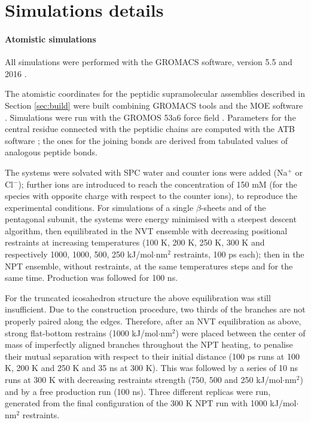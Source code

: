 \section{Simulations details} \label{sec:details}

\paragraph{Atomistic simulations}
All simulations were performed with the GROMACS software, version 5.5 and 2016 \cite{Berendsen1995,Abraham2015,gromacs_man}. 

The atomistic coordinates for the peptidic supramolecular assemblies described in Section \ref{sec:build} were built combining GROMACS tools and the MOE software \cite{moe}.
%
Simulations were run with the GROMOS 53a6 force field \cite{Oostenbrink2004}. Parameters for the central residue connected with the peptidic chains are computed with the ATB software \cite{Malde2011, Koziara2014}; the ones for the joining bonds are derived from tabulated values of analogous peptide bonds. 

The systems were solvated with SPC water \cite{Berendsen1981} and counter ions were added (Na$^+$ or Cl$^-$); further ions are introduced to reach the concentration of 150 mM (for the species with opposite charge with respect to the counter ions), to reproduce the experimental conditions.
%
For simulations of a single $\beta$-sheets and of the pentagonal subunit, the systems were energy minimised with a steepest descent algorithm, then equilibrated in the NVT ensemble with decreasing positional restraints at increasing temperatures (100 K, 200 K, 250 K, 300 K and respectively 1000, 1000, 500, 250 kJ/mol$\cdot$nm$^2$ restraints, 100 ps each); then in the NPT ensemble, without restraints, at the same temperatures steps and for the same time. Production was followed for 100 ns.

For the truncated icosahedron structure the above equilibration was still insufficient. Due to the construction procedure, two thirds of the branches are not properly paired along the edges.
%
Therefore, after an NVT equilibration as above, strong flat-bottom restrains (1000 kJ/mol$\cdot$nm$^2$) were placed between the center of mass of imperfectly aligned branches throughout the NPT heating, to penalise their mutual separation with respect to their initial distance (100 ps runs at 100 K, 200 K and 250 K and 35 ns at 300 K).
%
This was followed by a series of 10 ns runs at 300 K with decreasing restraints strength (750, 500 and 250 kJ/mol$\cdot$nm$^2$) and by a free production run (100 ns).
%
Three different replicas were run, generated from the final configuration of the 300 K NPT run with 1000 kJ/mol$\cdot$nm$^2$ restraints.

